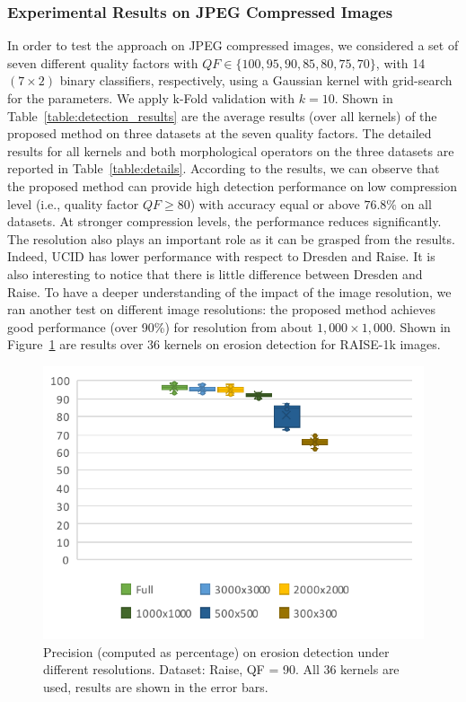 \documentclass{ieeeaccess}
\begin{document}
\subsubsection{Experimental Results on JPEG Compressed Images}
In order to test the approach on JPEG compressed images, we considered a set of seven different quality factors with $QF \in \{100,95,90,85,80,75,70\}$, with 14 $(7\times 2)$ binary classifiers, respectively,
using a Gaussian kernel with grid-search for the parameters. We apply k-Fold validation with $k = 10$. Shown in Table~\ref{table:detection_results} are the average results (over all kernels) of the proposed method on three datasets at the seven quality factors. The detailed results for all kernels and both morphological operators on the three datasets are reported in Table~\ref{table:details}. 
%
According to the results, we can observe that the proposed method can provide high detection performance on low compression level (i.e., quality factor $QF \ge 80$) with accuracy equal or above $76.8\%$ on all datasets. At stronger compression levels, the performance reduces significantly. The resolution also plays an important role as it can be grasped from the results. Indeed, UCID has lower performance with respect to Dresden and Raise. It is also interesting to notice that there is little difference between Dresden and Raise. To have a deeper understanding of the impact of the image resolution, we ran another test on different image resolutions: the proposed method achieves good performance (over 90\%) for resolution from about $1,000 \times 1,000$. Shown in Figure~\ref{fig:resolutions} are results over 36 kernels on erosion detection for RAISE-1k images.%

\begin{figure}[t!]
	\centering
	\includegraphics[width=\linewidth]{resolutions.pdf}
	\caption{Precision (computed as percentage) on erosion detection under different resolutions. Dataset: Raise, QF = 90. All 36 kernels are used, results are shown in the error bars.}
	\label{fig:resolutions}
\end{figure}
\end{document}
